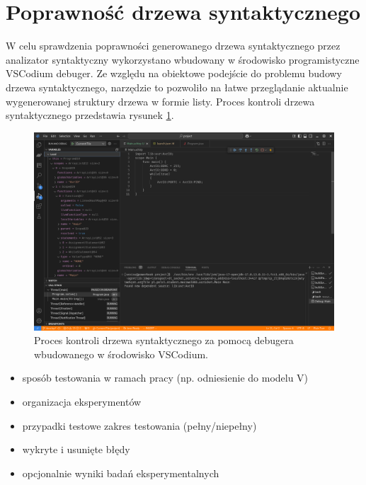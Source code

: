 \section{Poprawność drzewa syntaktycznego}
W celu sprawdzenia poprawności generowanego drzewa syntaktycznego przez analizator syntaktyczny wykorzystano wbudowany w środowisko programistyczne VSCodium debuger. Ze względu na obiektowe podejście do problemu budowy drzewa syntaktycznego, narzędzie to pozwoliło na łatwe przeglądanie aktualnie wygenerowanej struktury drzewa w formie listy. Proces kontroli drzewa syntaktycznego przedstawia rysunek \ref{fig:vscodium-debug-ast}.

\begin{figure}
\centering
	\includegraphics[width=1\textwidth]{graf/vscodium-debug-ast.png}
	\caption{Proces kontroli drzewa syntaktycznego za pomocą debugera wbudowanego w środowisko VSCodium.}
\label{fig:vscodium-debug-ast}
\end{figure}

\begin{itemize}
\item sposób testowania w ramach pracy (np. odniesienie do modelu V)
\item organizacja eksperymentów
\item przypadki testowe zakres testowania (pełny/niepełny)
\item wykryte i usunięte błędy
\item opcjonalnie wyniki badań eksperymentalnych
\end{itemize}

